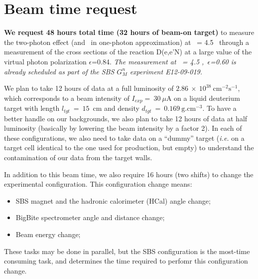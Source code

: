 \section{Beam time request}

{\bf We request 48 hours total time (32 hours of beam-on target)} to measure the two-photon effect (and \gen~in one-photon approximation) 
at \qsq~= 4.5 \gevcsq~through a measurement of the cross sections of the reaction D(e,e'N) at a large value of the virtual photon polarization $\epsilon$=0.84.
{\em The measurement at \qsq~= 4.5 \gevcsq,~$\epsilon$=0.60 is already scheduled as part of the SBS $G_M^n$ experiment E12-09-019.}

We plan to take 12 hours of data at a full luminosity of $2.86~\times~10^{38}~\mathrm{cm}^{-2}\mathrm{s}^{-1}$, which corresponds to a beam intensity of $I_{exp} =~30~\mu$A on a liquid deuterium target with length $l_{tgt}~=~15$~cm and density $d_{tgt}~=~0.169~\mathrm{g.cm}^{-3}$. 
To have a better handle on our backgrounds, we also plan to take 12 hours of data at half luminosity (basically by lowering the beam intensity by a factor 2).
In each of these configurations, we also need to take data on a ``dummy'' target ({\it i.e.} on a target cell identical to the one used for production, but empty) to understand the contamination of our data from the target walls.

In addition to this beam time, we also require 16 hours (two shifts) to change the experimental configuration.
This configuration change means:
%
\begin{itemize}
\item{SBS magnet and the hadronic calorimeter (HCal) angle change;}
\item{BigBite spectrometer angle and distance change;}
\item{Beam energy change;}
\end{itemize}
%
These tasks may be done in parallel, but the SBS configuration is the most-time consuming task, and determines the time required to perfomr this configuration change.

